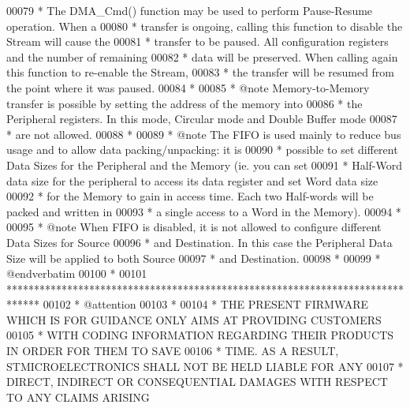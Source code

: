 \begin{DoxyCode}
00079 \textcolor{comment}{  *              The DMA\_Cmd() function may be used to perform Pause-Resume operation. When a }
00080 \textcolor{comment}{  *              transfer is ongoing, calling this function to disable the Stream will cause the }
00081 \textcolor{comment}{  *              transfer to be paused. All configuration registers and the number of remaining }
00082 \textcolor{comment}{  *              data will be preserved. When calling again this function to re-enable the Stream, }
00083 \textcolor{comment}{  *              the transfer will be resumed from the point where it was paused.          }
00084 \textcolor{comment}{  *                 }
00085 \textcolor{comment}{  * @note   Memory-to-Memory transfer is possible by setting the address of the memory into}
00086 \textcolor{comment}{  *         the Peripheral registers. In this mode, Circular mode and Double Buffer mode}
00087 \textcolor{comment}{  *         are not allowed.}
00088 \textcolor{comment}{  *  }
00089 \textcolor{comment}{  * @note   The FIFO is used mainly to reduce bus usage and to allow data packing/unpacking: it is}
00090 \textcolor{comment}{  *         possible to set different Data Sizes for the Peripheral and the Memory (ie. you can set}
00091 \textcolor{comment}{  *         Half-Word data size for the peripheral to access its data register and set Word data size}
00092 \textcolor{comment}{  *         for the Memory to gain in access time. Each two Half-words will be packed and written in}
00093 \textcolor{comment}{  *         a single access to a Word in the Memory).}
00094 \textcolor{comment}{  *    }
00095 \textcolor{comment}{  * @note  When FIFO is disabled, it is not allowed to configure different Data Sizes for Source}
00096 \textcolor{comment}{  *        and Destination. In this case the Peripheral Data Size will be applied to both Source}
00097 \textcolor{comment}{  *        and Destination.               }
00098 \textcolor{comment}{  *}
00099 \textcolor{comment}{  *  @endverbatim}
00100 \textcolor{comment}{  *                                  }
00101 \textcolor{comment}{  ******************************************************************************}
00102 \textcolor{comment}{  * @attention}
00103 \textcolor{comment}{  *}
00104 \textcolor{comment}{  * THE PRESENT FIRMWARE WHICH IS FOR GUIDANCE ONLY AIMS AT PROVIDING CUSTOMERS}
00105 \textcolor{comment}{  * WITH CODING INFORMATION REGARDING THEIR PRODUCTS IN ORDER FOR THEM TO SAVE}
00106 \textcolor{comment}{  * TIME. AS A RESULT, STMICROELECTRONICS SHALL NOT BE HELD LIABLE FOR ANY}
00107 \textcolor{comment}{  * DIRECT, INDIRECT OR CONSEQUENTIAL DAMAGES WITH RESPECT TO ANY CLAIMS ARISING}

\end{DoxyCode}

